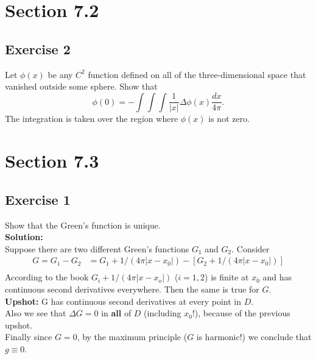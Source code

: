 \documentclass[12pt]{article}%
\begin{document}
\section*{Section 7.2}
\subsection*{Exercise 2}
Let $\phi(x)$ be any $C^2$ function defined on all of the three-dimensional
space that vanished outside some sphere. Show that
\[
    \phi(0)=-\int\int\int \frac{1}{|x|}\Delta \phi(x) \frac{dx}{4\pi}.
\]
The integration is taken over the region where $\phi(x)$ is not zero.
\section*{Section 7.3}
\subsection*{Exercise 1}
Show that the Green's function is unique.\\
\textbf{Solution:}\\
Suppose there are two different Green's functions $G_1$ and $G_2$. Consider
\begin{align*}
    G=G_1-G_2&= G_1 + 1/(4\pi |x-x_0|) - [G_2 + 1/(4\pi |x-x_0|)]\\
\end{align*}
According to the book $G_i+1/(4\pi|x-x_o|)$ ($i=1,2$) is finite at $x_0$ and has
continuous second derivatives everywhere. Then the same is true for $G$.\\
\textbf{Upshot:} G has continuous second derivatives at every point in $D$.\\
Also we see that $\Delta G =0$ in \textbf{all} of $D$ (including $x_0$!),
because of the previous upshot.\\
Finally since $G=0$, by the maximum principle ($G$ is harmonic!) we conclude
that $g\equiv0$.
\end{document}
